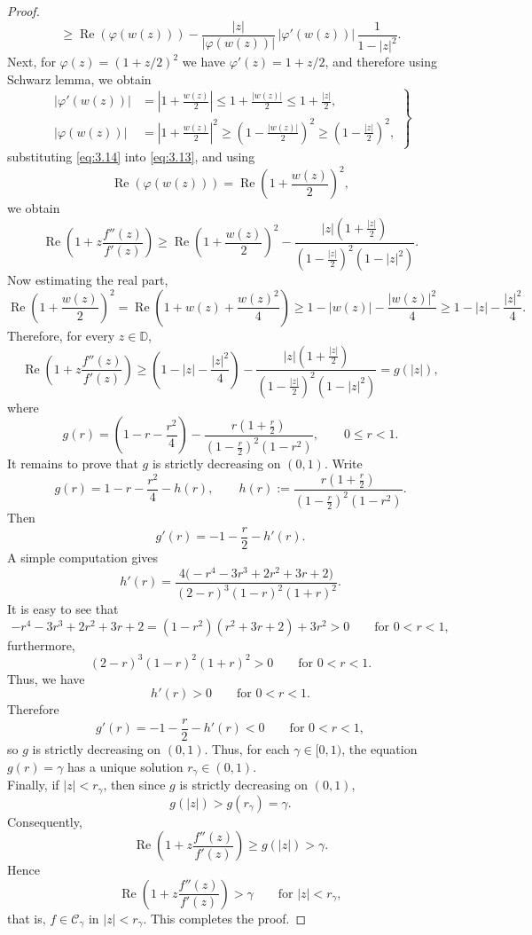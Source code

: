 \documentclass[a4paper,12pt,reqno]{amsart} %
\numberwithin{equation}{section}
\theoremstyle{definition}
\begin{document}
\begin{proof}
\[\ge \operatorname{Re}(\varphi(w(z)))-
\frac{|z|}{|\varphi(w(z))|}\,|\varphi'(w(z))|\,
\frac{1}{1-|z|^2}.
\]
Next, for $\varphi(z)=\left(1+ z/2\right)^2$ we have $\varphi'(z)=1+ z/2$, and therefore using Schwarz lemma, we obtain
\begin{equation}\label{eq:3.14}
\left.
\begin{aligned}
	|\varphi'(w(z))|
	&=\left|1+\frac{w(z)}2\right|
	\le 1+\frac{|w(z)|}{2}
	\le 1+\frac{|z|}{2},\\[4mm]
	|\varphi(w(z))|
	&=\left|1+\frac{w(z)}2\right|^2
	\ge \left(1-\frac{|w(z)|}{2}\right)^2
	\ge \left(1-\frac{|z|}{2}\right)^2,
\end{aligned}
\right\}
\end{equation}
substituting \eqref{eq:3.14} into \eqref{eq:3.13}, and using
\[
\operatorname{Re}(\varphi(w(z)))=\operatorname{Re}\!\left(1+\frac{w(z)}2\right)^2,
\]
we obtain
\[
\operatorname{Re}\!\left(1+z\frac{f''(z)}{f'(z)}\right)
\ge
\operatorname{Re}\!\left(1+\frac{w(z)}2\right)^2
-\frac{|z|\left(1+\frac{|z|}{2}\right)}
{\left(1-\frac{|z|}{2}\right)^2(1-|z|^2)}.
\]
Now estimating the real part, 
\[
\operatorname{Re}\!\left(1+\frac{w(z)}2\right)^2
=
\operatorname{Re}\!\left(1+w(z)+\frac{w(z)^2}{4}\right)
\ge 1-|w(z)|-\frac{|w(z)|^2}{4}
\ge 1-|z|-\frac{|z|^2}{4}.
\]
Therefore, for every $z\in\mathbb D$,
\[
\operatorname{Re}\!\left(1+z\frac{f''(z)}{f'(z)}\right)
\ge
\left(1-|z|-\frac{|z|^2}{4}\right)
-\frac{|z|\left(1+\frac {|z|}2\right)}{\left(1-\frac {|z|}2\right)^2(1-|z|^2)}
=
g(|z|),
\]
where
\[
g(r)=\left(1-r-\frac{r^2}{4}\right)-\frac{r\left(1+\frac r2\right)}{\left(1-\frac r2\right)^2(1-r^2)},
\qquad 0\le r<1.
\]
It remains to prove that $g$ is strictly decreasing on $(0,1)$. Write
\[
g(r)=1-r-\frac{r^2}{4}-h(r),
\qquad
h(r):=\frac{r\left(1+\frac r2\right)}{\left(1-\frac r2\right)^2(1-r^2)}.
\]
Then
\[
g'(r)=-1-\frac r2-h'(r).
\]
A simple computation gives
\[
h'(r)=
\frac{4\bigl(-r^4-3r^3+2r^2+3r+2\bigr)}
{(2-r)^3(1-r)^2(1+r)^2}.
\]
It is easy to see that 
\[
-r^4-3r^3+2r^2+3r+2
=
(1-r^2)(r^2+3r+2)+3r^2>0
\qquad \text{for } 0<r<1,
\]
furthermore, 
\[
(2-r)^3(1-r)^2(1+r)^2>0
\qquad \text{for } 0<r<1.
\]
Thus, we have 
\[
h'(r)>0
\qquad \text{for } 0<r<1.
\]
Therefore
\[
g'(r)=-1-\frac r2-h'(r)<0
\qquad \text{for } 0<r<1,
\]
so $g$ is strictly decreasing on $(0,1)$.
Thus, for each $\gamma\in[0,1)$, the equation $g(r)=\gamma$ has a unique solution $r_\gamma\in(0,1)$.\\[2mm]
Finally, if $|z|<r_\gamma$, then since $g$ is strictly decreasing on $(0,1)$,
\[
g(|z|)>g(r_\gamma)=\gamma.
\]
Consequently,
\[
\operatorname{Re}\!\left(1+z\frac{f''(z)}{f'(z)}\right)\ge g(|z|)>\gamma.
\]
Hence
\[
\operatorname{Re}\!\left(1+z\frac{f''(z)}{f'(z)}\right)>\gamma
\qquad \text{for } |z|<r_\gamma,
\]
that is, $f\in \mathcal{C}_\gamma$ in $|z|<r_\gamma$.
This completes the proof.
\end{proof}
\end{document}
